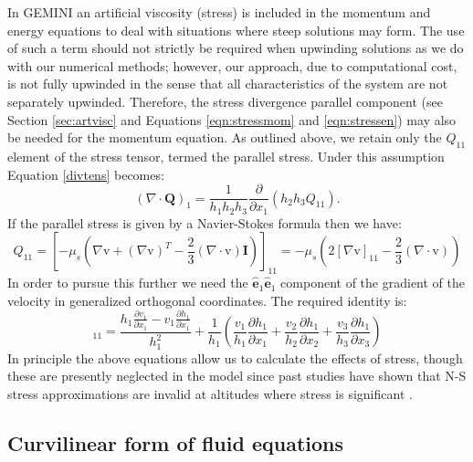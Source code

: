 \documentclass[11pt,letterpaper]{article}
\begin{document}
In GEMINI an artificial viscosity (stress) is included in the momentum and energy equations to deal with situations where steep solutions may form.  The use of such a term should not strictly be required when upwinding solutions as we do with our numerical methods; however, our approach, due to computational cost, is not fully upwinded in the sense that all characteristics of the system are not separately upwinded.  Therefore, the stress divergence parallel component (see Section \ref{sec:artvisc} and Equations \ref{eqn:stressmom} and \ref{eqn:stressen}) may also be needed for the momentum equation.  As outlined above, we retain only the $Q_{11}$ element of the stress tensor, termed the parallel stress.  Under this assumption Equation \ref{divtens} becomes:
\begin{equation}
(\nabla \cdot \mathbf{Q})_1 = \frac{1}{h_1 h_2 h_3} \frac{\partial}{\partial x_1}(h_2 h_3 Q_{11}).
\end{equation}
If the parallel stress is given by a Navier-Stokes formula then we have:
\begin{equation}
Q_{11} = \left[-\mu_s \left( \nabla \boldsymbol{\mathrm{v}} + (\nabla \boldsymbol{\mathrm{v}})^T - \frac{2}{3} (\nabla \cdot \boldsymbol{\mathrm{v}}) \mathbf{I} \right) \right]_{11} = -\mu_s \left( 2 [\nabla \boldsymbol{\mathrm{v}}]_{11} - \frac{2}{3} (\nabla \cdot \boldsymbol{\mathrm{v}}) \right)
\end{equation}
In order to pursue this further we need the $\hat{\mathbf{e}}_1 \hat{\mathbf{e}}_1$ component of the gradient of the velocity in generalized orthogonal coordinates.  The required identity is:
\begin{equation}
[\nabla \boldsymbol{\mathrm{v}}]_{11} = \frac{h_1 \frac{\partial v_1}{\partial x_1} - v_1 \frac{\partial h_1}{\partial x_1}}{h_1^2} + \frac{1}{h_1} \left( \frac{v_1}{h_1} \frac{\partial h_1}{\partial x_1} + \frac{v_2}{h_2} \frac{\partial h_1}{\partial x_2} + \frac{v_3}{h_3} \frac{\partial h_1}{\partial x_3} \right)
\end{equation}
In principle the above equations allow us to calculate the effects of stress, though these are presently neglected in the model since past studies have shown that N-S stress approximations are invalid at altitudes where stress is significant \citep{Schunk:1975}.

\subsection{Curvilinear form of fluid equations}
\end{document}
